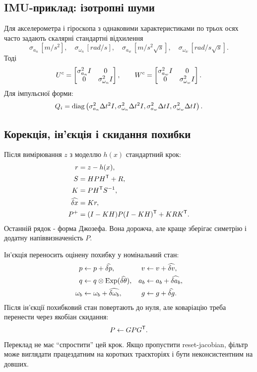 \subsection{IMU-приклад: ізотропні шуми}

Для акселерометра і гіроскопа з однаковими характеристиками по трьох осях часто задають скалярні стандартні відхилення
\begin{equation}
 \sigma_{a_n}\,[m/s^2],\quad \sigma_{\omega_n}\,[rad/s],\quad
 \sigma_{a_w}\,[m/s^2\sqrt{s}],\quad \sigma_{\omega_w}\,[rad/s\sqrt{s}].
\end{equation}
Тоді
\begin{equation}
 U^c=\begin{bmatrix}\sigma_{a_n}^2I&0\\0&\sigma_{\omega_n}^2I\end{bmatrix},\qquad
 W^c=\begin{bmatrix}\sigma_{a_w}^2I&0\\0&\sigma_{\omega_w}^2I\end{bmatrix}.
\end{equation}
Для імпульсної форми:
\begin{equation}
 Q_i=\mathrm{diag}\left(\sigma_{a_n}^2\Delta t^2 I,
 \sigma_{\omega_n}^2\Delta t^2 I,
 \sigma_{a_w}^2\Delta t I,
 \sigma_{\omega_w}^2\Delta t I\right).
\end{equation}

\subsection{Корекція, ін'єкція і скидання похибки}

Після вимірювання $z$ з моделлю $h(x)$ стандартний крок:
\begin{align}
 r &= z-h(x),\\
 S &= HPH^{\mathsf T}+R,\\
 K &= PH^{\mathsf T} S^{-1},\\
 \widehat{\delta x} &= Kr,\\
 P^+ &= (I-KH)P(I-KH)^{\mathsf T}+KRK^{\mathsf T}.
\end{align}
Останній рядок - форма Джозефа. Вона дорожча, але краще зберігає симетрію і додатну напіввизначеність $P$.

Ін'єкція переносить оцінену похибку у номінальний стан:
\begin{align}
 p &\leftarrow p+\widehat{\delta p}, &
 v &\leftarrow v+\widehat{\delta v},\\
 q &\leftarrow q\otimes\mathrm{Exp}(\widehat{\delta\theta}), &
 a_b &\leftarrow a_b+\widehat{\delta a_b},\\
 \omega_b &\leftarrow \omega_b+\widehat{\delta\omega_b}, &
 g &\leftarrow g+\widehat{\delta g}.
\end{align}
Після ін'єкції похибковий стан повертають до нуля, але коваріацію треба перенести через якобіан скидання:
\begin{equation}
 P \leftarrow GPG^{\mathsf T}.
\end{equation}
Переклад не має ``спростити'' цей крок. Якщо пропустити reset-jacobian, фільтр може виглядати працездатним на коротких траєкторіях і бути неконсистентним на довших.
